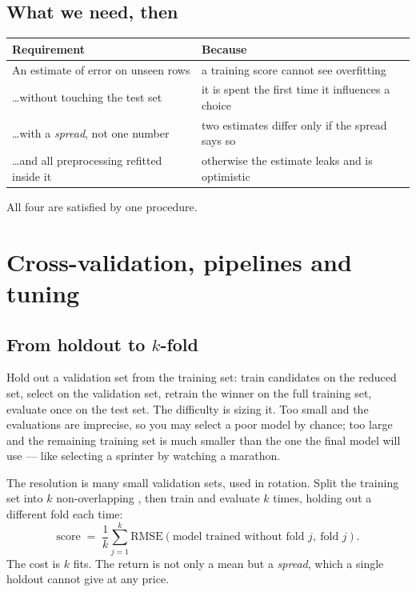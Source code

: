 \documentclass[11pt,a4paper]{article}
\begin{document}
\subsection{What we need, then}

\begin{center}
\small
\begin{tabular}{p{}p{}}
\toprule
\textbf{Requirement} & \textbf{Because} \\
\midrule
An estimate of error on unseen rows & a training score cannot see overfitting \\
\ldots without touching the test set & it is spent the first time it influences
                                       a choice \\
\ldots with a \emph{spread}, not one number & two estimates differ only if the
                                       spread says so \\
\ldots and all preprocessing refitted inside it & otherwise the estimate leaks
                                       and is optimistic \\
\bottomrule
\end{tabular}
\end{center}

All four are satisfied by one procedure.

\section{Cross-validation, pipelines and tuning}

\subsection{From holdout to $k$-fold}

Hold out a validation set from the training set: train candidates on the
reduced set, select on the validation set, retrain the winner on the full
training set, evaluate once on the test set. The difficulty is sizing it. Too
small and the evaluations are imprecise, so you may select a poor model by
chance; too large and the remaining training set is much smaller than the one
the final model will use --- like selecting a sprinter by watching a marathon.

The resolution is many small validation sets, used in rotation. Split the
training set into $k$ non-overlapping , then train and evaluate $k$
times, holding out a different fold each time:
\[ \text{score} \;=\; \frac{1}{k}\sum_{j=1}^{k}
   \mathrm{RMSE}\!\left(\text{model trained without fold } j,\ \text{fold }
   j\right). \]
The cost is $k$ fits. The return is not only a mean but a \emph{spread}, which
a single holdout cannot give at any price.
\end{document}
